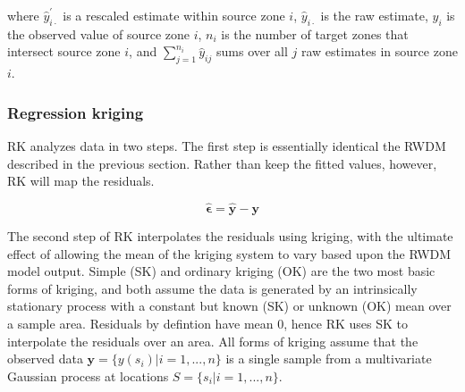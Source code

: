 \documentclass[draft]{article}
\begin{document}
where $\hat{y}^{'}_{i\cdot}$ is a rescaled estimate within source zone $i$, $\hat{y}_{i\cdot}$ is the raw estimate, $y_i$ is the observed value of source zone $i$, $n_i$ is the number of target zones that intersect source zone $i$, and $\sum_{j=1}^{n_i} \hat{y}_{ij}$ sums over all $j$ raw estimates in source zone $i$.


\subsubsection{Regression kriging} \label{sec:rk}

RK analyzes data in two steps.  The first step is essentially identical the RWDM described in the previous section.  Rather than keep the fitted values, however, RK will map the residuals.

\[\hat{\bm{\epsilon}} = \hat{\bm{y}} - \bm{y}\]

The second step of RK interpolates the residuals using kriging, with the ultimate effect of allowing the mean of the kriging system to vary based upon the RWDM model output.  Simple (SK) and ordinary kriging (OK) are the two most basic forms of kriging, and both assume the data is generated by an intrinsically stationary process with a constant but known (SK) or unknown (OK) mean over a sample area.  Residuals by defintion have mean $0$, hence RK uses SK to interpolate the residuals over an area.  All forms of kriging assume that the observed data $\bm{y}=\{y(s_i) | i=1, ..., n\}$ is a single sample from a multivariate Gaussian process at locations $S=\{s_i | i=1, ..., n\}$.
\end{document}
